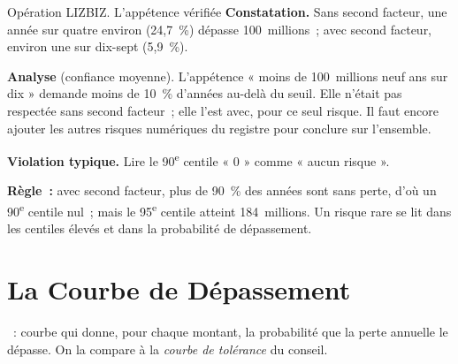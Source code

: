 \begin{boxscenario}{Opération LIZBIZ. L'appétence vérifiée}
\textbf{Constatation.} Sans second facteur, une année sur quatre environ
(24,7~\%) dépasse 100~millions~; avec second facteur, environ une sur
dix-sept (5,9~\%).

\medskip
\textbf{Analyse} (confiance moyenne). L'appétence « moins de 100~millions
neuf ans sur dix » demande moins de 10~\% d'années au-delà du seuil. Elle
n'était pas respectée sans second facteur~; elle l'est avec, pour ce seul
risque. Il faut encore ajouter les autres risques numériques du registre
pour conclure sur l'ensemble.
\end{boxscenario}

\begin{boxalert}
\textbf{Violation typique.} Lire le 90\textsuperscript{e} centile « 0 »
comme « aucun risque ».

\smallskip
\textbf{Règle~:} avec second facteur, plus de 90~\% des années sont sans
perte, d'où un 90\textsuperscript{e} centile nul~; mais le
95\textsuperscript{e} centile atteint 184~millions. Un risque rare se lit
dans les centiles élevés et dans la probabilité de dépassement.
\end{boxalert}

\section{La Courbe de Dépassement}
\label{sec:c10-courbe}

\begin{boxdef}
~: courbe qui donne, pour chaque
montant, la probabilité que la perte annuelle le dépasse. On la compare à
la \emph{courbe de tolérance} du conseil.
\end{boxdef}

